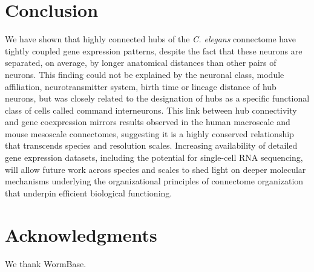 \documentclass[10pt,letterpaper]{article}
\begin{document}
{\section*{Conclusion}

We have shown that highly connected hubs of the \textit{C. elegans} connectome have tightly coupled gene expression patterns, despite the fact that these neurons are separated, on average, by longer anatomical distances than other pairs of neurons. 
This finding could not be explained by the neuronal class, module affiliation, neurotransmitter system, birth time or lineage distance of hub neurons, but was closely related to the designation of hubs as a specific functional class of cells called command interneurons. 
This link between hub connectivity and gene coexpression mirrors results observed in the human macroscale and mouse mesoscale connectomes, suggesting it is a highly conserved relationship that transcends species and resolution scales.    
Increasing availability of detailed gene expression datasets, including the potential for single-cell RNA sequencing, will allow future work across species and scales to shed light on deeper molecular mechanisms underlying the organizational principles of connectome organization that underpin efficient biological functioning.

\section*{Acknowledgments}
We thank WormBase.

\nolinenumbers

%
%
%




}
\end{document}

